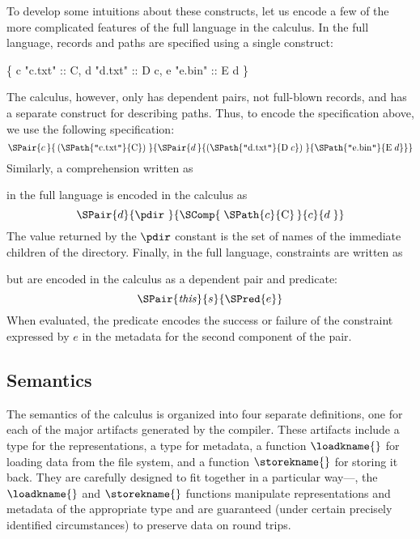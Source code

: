 To develop some intuitions about these constructs, let us encode a few
of the more complicated features of the full \forest{} language in the
calculus. In the full language, records and paths are specified using
a single construct:
%
\begin{centercode}
  \{ c  "c.txt" :: C, 
    d  "d.txt" :: D c, 
    e  "e.bin" :: E d \}
\end{centercode}
%
The calculus, however, only has dependent pairs, not full-blown
records, and has a separate construct for describing paths. Thus, to
encode the specification above, we use the following specification:
%
\[
\SPair{c\,}{\,(\SPath{\texttt{"}\mathrm{c.txt}\texttt{"}}{\mathrm{C}})\;}
           {\SPair{d\,}{(\SPath{\texttt{"}\mathrm{d.txt}\texttt{"}}{\mathrm{D}\; c})\;}
                       {\SPath{\texttt{"}\mathrm{e.bin}\texttt{"}}{\mathrm{E}\; d}}} 
\]
%
Similarly, a comprehension written as
%
\begin{center}
\cd{[c :: C | c <- \kw{matches} <| GL "*" |> ]} 
\end{center}
%
in the full language is encoded in the calculus as
%
\[
\SPair{d}{\pdir~}{\SComp{\;\SPath{c}{\mathrm{C}}\,}{c}{d\;}}
\]
%
The value returned by the $\pdir$ constant is the set of names of the
immediate children of the directory. Finally, in the full language,
constraints are written as
%
\begin{center}
\end{center}
%
but are encoded in the calculus as a dependent pair and 
predicate:
%
\[
\SPair{\mathit{this}}{s}{\SPred{e}}
\]
%
When evaluated, the predicate encodes the success or failure of the
constraint expressed by $e$ in the metadata for the second component
of the pair.

\subsection{Semantics}
%
The semantics of the \forest{} calculus is organized into four
separate definitions, one for each of the major artifacts generated by
the compiler. These artifacts include a type for the representations,
a type for metadata, a function $\loadkname{}$ for loading data from
the file system, and a function $\storekname{}$ for storing it
back. They are carefully designed to fit together in a particular
way---\eg, the $\loadkname{}$ and $\storekname{}$ functions manipulate
representations and metadata of the appropriate type and are
guaranteed (under certain precisely identified circumstances) to
preserve data on round trips.

